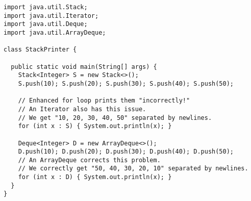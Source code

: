 \begin{cl}[]{}
\begin{lstlisting}[language=MyJava]
import java.util.Stack;
import java.util.Iterator;
import java.util.Deque;
import java.util.ArrayDeque;

class StackPrinter {

  public static void main(String[] args) {
    Stack<Integer> S = new Stack<>();
    S.push(10); S.push(20); S.push(30); S.push(40); S.push(50);

    // Enhanced for loop prints them "incorrectly!"
    // An Iterator also has this issue.
    // We get "10, 20, 30, 40, 50" separated by newlines.
    for (int x : S) { System.out.println(x); }

    Deque<Integer> D = new ArrayDeque<>();
    D.push(10); D.push(20); D.push(30); D.push(40); D.push(50);    
    // An ArrayDeque corrects this problem.
    // We correctly get "50, 40, 30, 20, 10" separated by newlines.
    for (int x : D) { System.out.println(x); }
  }
}
\end{lstlisting}
\end{cl}



